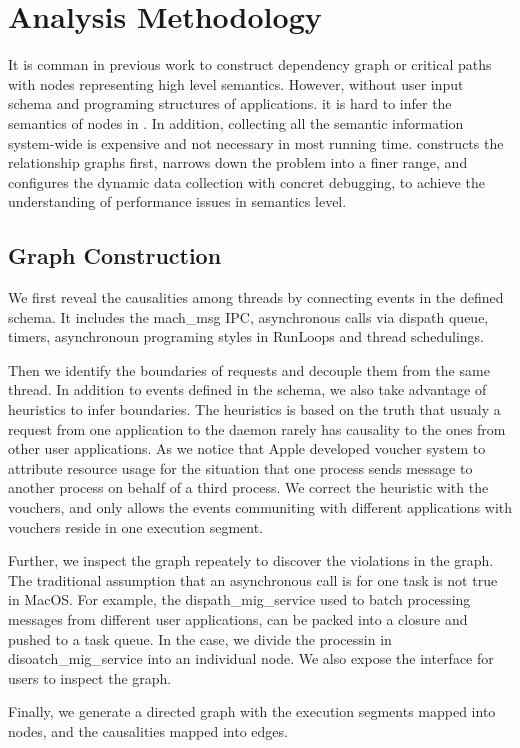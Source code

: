 \section{Analysis Methodology}
It is comman in previous work to construct dependency graph or critical paths
with nodes representing high level semantics. 
However, without user input schema and programing structures of applications.
it is hard to infer the semantics of nodes in \xxx.
In addition, collecting all the semantic information system-wide is expensive
and not necessary in most running time.
\xxx constructs the relationship graphs first, narrows down the problem into a finer range,
and configures the dynamic data collection with concret debugging,
to achieve the understanding of performance issues in semantics level.

\subsection{Graph Construction}
We first reveal the causalities among threads by connecting events in the defined schema.
It includes the mach\_msg IPC, asynchronous calls via dispath queue, timers,
asynchronoun programing styles in RunLoops and thread schedulings. 

Then we identify the boundaries of requests and decouple them from the same thread.
In addition to events defined in the schema, we also take advantage of heuristics to infer boundaries.
The heuristics is based on the truth that usualy a request from one application to the daemon rarely
has causality to the ones from other user applications.
As we notice that Apple developed voucher system to attribute resource usage for the situation
that one process sends message to another process on behalf of a third process. 
We correct the heuristic with the vouchers, and only allows the events communiting with
different applications with vouchers reside in one execution segment.

Further, we inspect the graph repeately to discover the violations in the graph.
The traditional assumption that an asynchronous call is for one task is not true in MacOS.
For example, the dispath\_mig\_service used to batch processing messages from different user applications,
can be packed into a closure and pushed to a task queue.
In the case, we divide the processin in disoatch\_mig\_service into an individual node.
We also expose the interface for users to inspect the graph.

Finally, we generate a directed graph with the execution segments mapped into nodes,
and the causalities mapped into edges.

